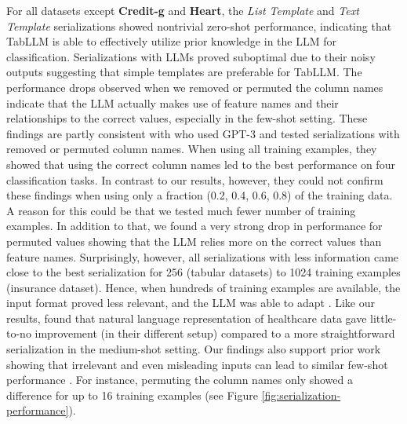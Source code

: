 For all datasets except \textbf{Credit-g} and \textbf{Heart}, the \textit{List Template} and \textit{Text Template} serializations showed nontrivial zero-shot performance, indicating that TabLLM is able to effectively utilize prior knowledge in the LLM for classification. Serializations with LLMs proved suboptimal due to their noisy outputs suggesting that simple templates are preferable for TabLLM. The performance drops observed when we removed or permuted the column names indicate that the LLM actually makes use of feature names and their relationships to the correct values, especially in the few-shot setting. These findings are partly consistent with \citet{dinh2022lift} who used GPT-3 and tested serializations with removed or permuted column names. When using all training examples, they showed that using the correct column names led to the best performance on four classification tasks. In contrast to our results, however, they could not confirm these findings when using only a fraction (0.2, 0.4, 0.6, 0.8) of the training data. A reason for this could be that we tested much fewer number of training examples. In addition to that, we found a very strong drop in performance for permuted values showing that the LLM relies more on the correct values than feature names. Surprisingly, however, all serializations with less information came close to the best serialization for 256 (tabular datasets) to 1024 training examples (insurance dataset). Hence, when hundreds of training examples are available, the input format proved less relevant, and the LLM was able to adapt  \citep{jin2022a}. Like our results, \citet{bertsimas2022tabtext} found that natural language representation of healthcare data gave little-to-no improvement (in their different setup) compared to a more straightforward serialization in the medium-shot setting. Our findings also support prior work showing that irrelevant and even misleading inputs can lead to similar few-shot performance \citep{min2022rethinking, webson_prompt-based_2022, reynolds2021prompt}. For instance, permuting the column names only showed a difference for up to 16 training examples (see Figure \ref{fig:serialization-performance}).


